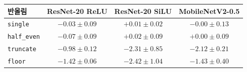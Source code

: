 \setlength{\tabcolsep}{4pt}
\begin{tabular}{lccc}
\toprule
반올림 & ResNet-20 ReLU & ResNet-20 SiLU & MobileNetV2-0.5 \\
\midrule
\texttt{single} & $-0.03\pm0.09$ & $+0.01\pm0.02$ & $-0.00\pm0.13$ \\
\texttt{half\_even} & $-0.07\pm0.09$ & $+0.02\pm0.09$ & $+0.00\pm0.09$ \\
\texttt{truncate} & $-0.98\pm0.12$ & $-2.31\pm0.85$ & $-2.12\pm0.21$ \\
\texttt{floor} & $-1.42\pm0.06$ & $-2.42\pm1.04$ & $-1.43\pm0.40$ \\
\bottomrule
\end{tabular}
